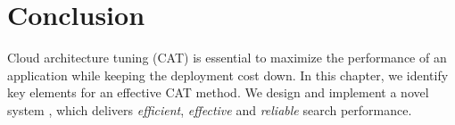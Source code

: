 \section{Conclusion}
\label{sec:conclusion}

Cloud architecture tuning (CAT) is essential
to maximize the performance of an application
while keeping the deployment cost down.
In this chapter, we identify key elements for an effective CAT method.
We design and implement a novel system \scout, which delivers
\emph{efficient}, \emph{effective} and \emph{reliable} search performance.



